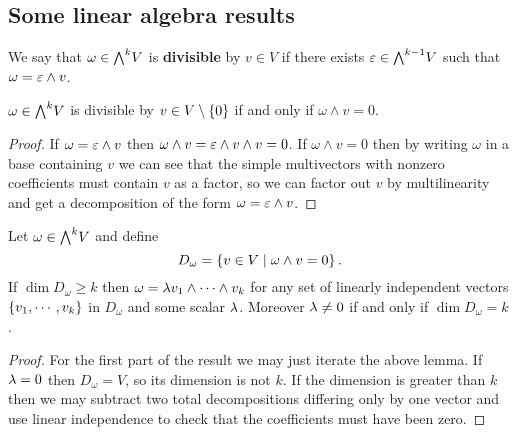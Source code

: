 \subsection{Some linear algebra results}
\begin{definition}[Divisibility]
We say that $\omega\in \bw V$ is \textbf{divisible} by $v\in V$ if there exists $\e\in \bw[k-1]V$ such that $\omega=\varepsilon\wedge v$.
\end{definition}
\begin{lemma}\label{Divisibility}
$\omega\in \bw V$ is divisible by $v\in V\setminus\{0\}$ if and only if $\omega\wedge v=0$.
\end{lemma}
\begin{proof}
If $\omega=\varepsilon\wedge v$ then $\omega\wedge v=\varepsilon\wedge v\wedge v=0$. If $\omega\wedge v=0$ then by writing $\omega$ in a base containing $v$ we can see that the simple multivectors with nonzero coefficients must contain $v$ as a factor, so we can factor out $v$ by multilinearity and get a decomposition of the form $\omega=\varepsilon\wedge v$.
\end{proof}

\begin{corollary}\label{TotalDecomposabilityCriterion}
Let $\omega\in \bw V$ and define 
\[D_\omega=\left\{{v\in V\mid \omega\wedge v=0}\right\}.\]
If $\dim D_\omega\geq k$ then $\omega=\lambda v_1\wedge \cdots\wedge v_k$ for any set of linearly independent vectors $\left\{{v_1,\cdots, v_k}\right\}$ in $D_\omega$ and some scalar $\lambda$. 
Moreover $\lambda\neq 0$ if and only if $\dim D_\omega= k$.
\end{corollary}
\begin{proof}
For the first part of the result we may just iterate the above lemma. If $\lambda=0$ then $D_\omega=V$, so its dimension is not $k$. If the dimension is greater than $k$ then we may subtract two total decompositions differing only by one vector and use linear independence to check that the coefficients must have been zero.
\end{proof}


